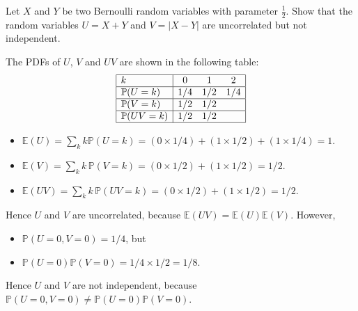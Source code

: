 \documentclass[lecture]{csm}
\newcommand{\prob}{\mathbb{P}}
\newcommand{\expe}{\mathbb{E}}
\def\it{\item}
\def\bit{\begin{itemize}}
\def\eit{\end{itemize}}
\begin{document}
\newpage %

\begin{example}
Let $X$ and $Y$ be two Bernoulli random variables with parameter $\frac{1}{2}$. Show that the random variables $U=X+Y$ and $V=|X-Y|$ are uncorrelated but not independent.
\end{example}

\begin{solution}
The PDFs of $U$, $V$ and $UV$ are shown in the following table:
\[
\begin{array}{|l|ccc|}\hline
k				& 0		& 1		& 2	\\ \hline
\prob(U=k)		& 1/4	& 1/2	& 1/4	\\ \hline
\prob(V=k)		& 1/2	& 1/2	& \\ \hline
\prob(UV=k) 		& 1/2	& 1/2	& \\ \hline
\end{array}
\]

%
\bit
\it $\expe(U) = \sum_k k\prob(U=k) = \left(0\times 1/4\right) + \left(1\times 1/2\right) + \left(1\times 1/4\right) = 1$.
\it $\expe(V) = \sum_k k\,\prob(V=k) = \left(0\times 1/2\right) + \left(1\times 1/2\right) = 1/2$.
\it $\expe(UV) = \sum_k k\,\prob(UV=k) = \left(0\times 1/2\right) + \left(1\times 1/2\right) = 1/2$.
\eit
Hence $U$ and $V$ are uncorrelated, because $\expe(UV)=\expe(U)\expe(V)$. However, 
\bit
\it $\prob(U=0,V=0) = 1/4$, but 
\it $\prob(U=0)\prob(V=0) = 1/4 \times 1/2 = 1/8$.
\eit
Hence $U$ and $V$ are not independent, because $\prob(U=0,V=0)\neq\prob(U=0)\prob(V=0)$.
\end{solution}
\end{document}
